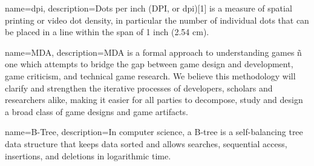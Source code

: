 {
	name={dpi},
	description={Dots per inch (DPI, or dpi)[1] is a measure of spatial printing or video dot density, in particular the number of individual dots that can be placed in a line within the span of 1 inch (2.54 cm).}
}

{
	name={MDA},
	description={MDA is a formal approach to understanding games ñ one
		which attempts to bridge the gap between game design and
		development, game criticism, and technical game research.
		We believe this methodology will clarify and strengthen the
		iterative processes of developers, scholars and researchers
		alike, making it easier for all parties to decompose, study
		and design a broad class of game designs and game
		artifacts. }	
}

{name={B-Tree},
	description={In computer science, a B-tree is a self-balancing tree data structure that keeps data sorted and allows searches, sequential access, insertions, and deletions in logarithmic time. }
}